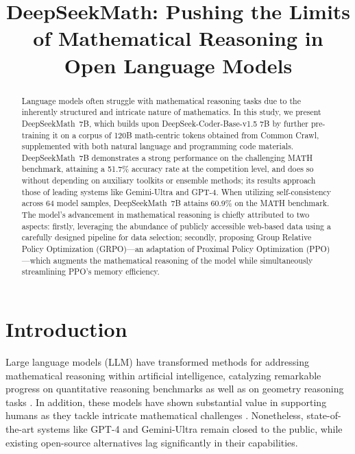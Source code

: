 \title{DeepSeekMath: Pushing the Limits of Mathematical Reasoning in Open Language Models}

\begin{abstract}
Language models often struggle with mathematical reasoning tasks due to the inherently structured and intricate nature of mathematics. In this study, we present DeepSeekMath~7B, which builds upon DeepSeek-Coder-Base-v1.5 7B by further pre-training it on a corpus of 120B math-centric tokens obtained from Common Crawl, supplemented with both natural language and programming code materials. DeepSeekMath~7B demonstrates a strong performance on the challenging MATH benchmark, attaining a 51.7\% accuracy rate at the competition level, and does so without depending on auxiliary toolkits or ensemble methods; its results approach those of leading systems like Gemini-Ultra and GPT-4. When utilizing self-consistency across 64 model samples, DeepSeekMath~7B attains 60.9\% on the MATH benchmark. The model's advancement in mathematical reasoning is chiefly attributed to two aspects: firstly, leveraging the abundance of publicly accessible web-based data using a carefully designed pipeline for data selection; secondly, proposing Group Relative Policy Optimization (GRPO)—an adaptation of Proximal Policy Optimization (PPO)—which augments the mathematical reasoning of the model while simultaneously streamlining PPO's memory efficiency.
\end{abstract}

\section{Introduction}

Large language models (LLM) have transformed methods for addressing mathematical reasoning within artificial intelligence, catalyzing remarkable progress on quantitative reasoning benchmarks \citep{MATH} as well as on geometry reasoning tasks \citep{trinh2024solving}. In addition, these models have shown substantial value in supporting humans as they tackle intricate mathematical challenges \citep{tao}. Nonetheless, state-of-the-art systems like GPT-4 \citep{gpt4} and Gemini-Ultra \citep{gemini} remain closed to the public, while existing open-source alternatives lag significantly in their capabilities.

